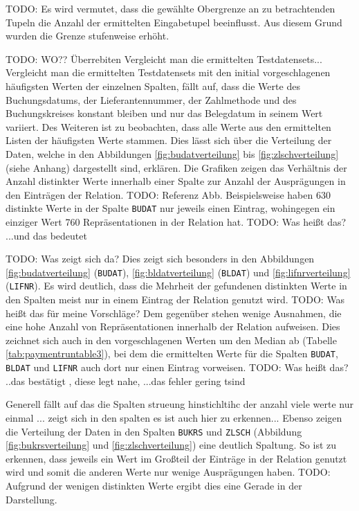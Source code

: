 TODO: Es wird vermutet, dass die gewählte Obergrenze an zu betrachtenden Tupeln die Anzahl der ermittelten Eingabetupel beeinflusst.
Aus diesem Grund wurden die Grenze stufenweise erhöht.




















TODO: WO?? Überrebiten
Vergleicht man die ermittelten Testdatensets...
Vergleicht man die ermittelten Testdatensets mit den initial vorgeschlagenen häufigsten Werten der einzelnen Spalten, fällt auf, dass die Werte des Buchungsdatums, der Lieferantennummer, der Zahlmethode und des Buchungskreises konstant bleiben und nur das Belegdatum in seinem Wert variiert.
Des Weiteren ist zu beobachten, dass alle Werte aus den ermittelten Listen der häufigsten Werte stammen.
Dies lässt sich über die Verteilung der Daten, welche in den Abbildungen \ref{fig:budatverteilung} bis \ref{fig:zlschverteilung} (siehe Anhang) dargestellt sind, erklären.
Die Grafiken zeigen das Verhältnis der Anzahl distinkter Werte innerhalb einer Spalte zur Anzahl der Ausprägungen in den Einträgen der Relation.
TODO: Referenz Abb.
Beispielsweise haben 630 distinkte Werte in der Spalte \texttt{BUDAT} nur jeweils einen Eintrag, wohingegen ein einziger Wert 760 Repräsentationen in der Relation hat.
TODO: Was heißt das? ...und das bedeutet

TODO: Was zeigt sich da?
Dies zeigt sich besonders in den Abbildungen \ref{fig:budatverteilung} (\texttt{BUDAT}), \ref{fig:bldatverteilung} (\texttt{BLDAT}) und \ref{fig:lifnrverteilung} (\texttt{LIFNR}).
Es wird deutlich, dass die Mehrheit der gefundenen distinkten Werte in den Spalten meist nur in einem Eintrag der Relation genutzt wird.
TODO: Was heißt das für meine Vorschläge?
Dem gegenüber stehen wenige Ausnahmen, die eine hohe Anzahl von Repräsentationen innerhalb der Relation aufweisen.
Dies zeichnet sich auch in den vorgeschlagenen Werten um den Median ab (Tabelle \ref{tab:paymentruntable3}), bei dem die ermittelten Werte für die Spalten \texttt{BUDAT}, \texttt{BLDAT} und \texttt{LIFNR} auch dort nur einen Eintrag vorweisen.
TODO: Was heißt das? ..das bestätigt , diese legt nahe, ...das fehler gering tsind

Generell fällt auf  das die Spalten strueung hinstichltihc der anzahl 
viele werte nur einmal ...
zeigt sich in den spalten
es ist auch hier zu erkennen...
Ebenso zeigen die Verteilung der Daten in den Spalten \texttt{BUKRS} und \texttt{ZLSCH} (Abbildung \ref{fig:bukrsverteilung} und \ref{fig:zlschverteilung}) eine deutlich Spaltung.
So ist zu erkennen, dass jeweils ein Wert im Großteil der Einträge in der Relation genutzt wird und somit die anderen Werte nur wenige Ausprägungen haben.
TODO: Aufgrund der wenigen distinkten Werte ergibt dies eine Gerade in der Darstellung.

